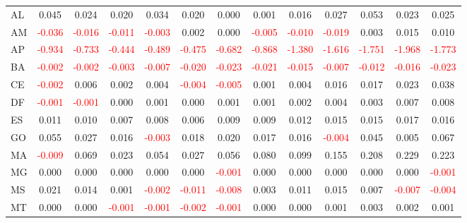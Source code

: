 \documentclass[a4paper, 12pt]{article}
\begin{document}
\begin{table}[H]
{\begin{tabular}{lcccccccccccc}
      AL & 0.045 & 0.024 & 0.020 & 0.034 & 0.020 & 0.000 & 0.001 & 0.016 & 0.027 & 0.053 & 0.023 & 0.025\\
      AM & \textcolor{red}{-0.036} & \textcolor{red}{-0.016} & \textcolor{red}{-0.011} & \textcolor{red}{-0.003} & 0.002 & 0.000 & \textcolor{red}{-0.005} & \textcolor{red}{-0.010} & \textcolor{red}{-0.019} & 0.003 & 0.015 & 0.010\\
      AP & \textcolor{red}{-0.934} & \textcolor{red}{-0.733} & \textcolor{red}{-0.444} & \textcolor{red}{-0.489} & \textcolor{red}{-0.475} & \textcolor{red}{-0.682} & \textcolor{red}{-0.868} & \textcolor{red}{-1.380} & \textcolor{red}{-1.616} & \textcolor{red}{-1.751} & \textcolor{red}{-1.968} & \textcolor{red}{-1.773}\\
      BA & \textcolor{red}{-0.002} & \textcolor{red}{-0.002} & \textcolor{red}{-0.003} & \textcolor{red}{-0.007} & \textcolor{red}{-0.020} & \textcolor{red}{-0.023} & \textcolor{red}{-0.021} & \textcolor{red}{-0.015} & \textcolor{red}{-0.007} & \textcolor{red}{-0.012} & \textcolor{red}{-0.016} & \textcolor{red}{-0.023}\\
      CE & \textcolor{red}{-0.002} & 0.006 & 0.002 & 0.004 & \textcolor{red}{-0.004} & \textcolor{red}{-0.005} & 0.001 & 0.004 & 0.016 & 0.017 & 0.023 & 0.038\\
      DF & \textcolor{red}{-0.001} & \textcolor{red}{-0.001} & 0.000 & 0.001 & 0.000 & 0.001 & 0.001 & 0.002 & 0.004 & 0.003 & 0.007 & 0.008\\
      ES & 0.011 & 0.010 & 0.007 & 0.008 & 0.006 & 0.009 & 0.009 & 0.012 & 0.015 & 0.015 & 0.017 & 0.016\\
      GO & 0.055 & 0.027 & 0.016 & \textcolor{red}{-0.003} & 0.018 & 0.020 & 0.017 & 0.016 & \textcolor{red}{-0.004} & 0.045 & 0.005 & 0.067\\
      MA & \textcolor{red}{-0.009} & 0.069 & 0.023 & 0.054 & 0.027 & 0.056 & 0.080 & 0.099 & 0.155 & 0.208 & 0.229 & 0.223\\
      MG & 0.000 & 0.000 & 0.000 & 0.000 & 0.000 & \textcolor{red}{-0.001} & 0.000 & 0.000 & 0.000 & 0.000 & 0.000 & \textcolor{red}{-0.001}\\
      MS & 0.021 & 0.014 & 0.001 & \textcolor{red}{-0.002} & \textcolor{red}{-0.011} & \textcolor{red}{-0.008} & 0.003 & 0.011 & 0.015 & 0.007 & \textcolor{red}{-0.007} & \textcolor{red}{-0.004}\\
      MT & 0.000 & 0.000 & \textcolor{red}{-0.001} & \textcolor{red}{-0.001} & \textcolor{red}{-0.002} & \textcolor{red}{-0.001} & 0.000 & 0.000 & 0.001 & 0.003 & 0.002 & 0.001\\

\end{tabular}}
\end{table}
\end{document}

